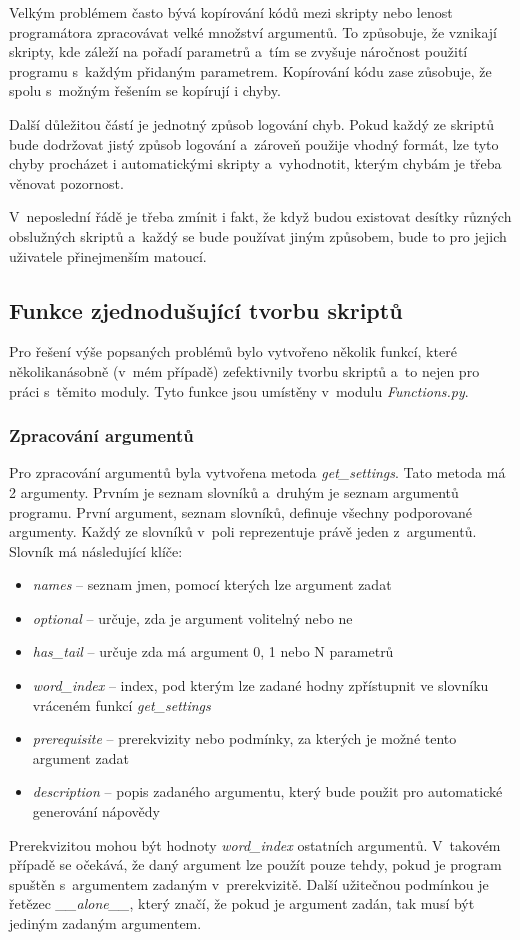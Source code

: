 Velkým problémem často bývá kopírování kódů mezi skripty nebo lenost programátora zpracovávat
velké množství argumentů. To způsobuje, že vznikají skripty, kde záleží na pořadí parametrů
a~tím se zvyšuje náročnost použití programu s~každým přidaným parametrem.
Kopírování kódu zase zůsobuje, že spolu s~možným řešením se kopírují i chyby.

Další důležitou částí je jednotný způsob logování chyb. Pokud každý ze skriptů bude dodržovat
jistý způsob logování a~zároveň použije vhodný formát, lze tyto chyby procházet i automatickými
skripty a~vyhodnotit, kterým chybám je třeba věnovat pozornost.

V~neposlední řádě je třeba zmínit i fakt, že když budou existovat desítky různých obslužných skriptů
a~každý se bude používat jiným způsobem, bude to pro jejich uživatele přinejmenším matoucí.

\subsection{Funkce zjednodušující tvorbu skriptů}
Pro řešení výše popsaných problémů bylo vytvořeno několik funkcí, které několikanásobně (v~mém případě)
zefektivnily tvorbu skriptů a~to nejen pro práci s~těmito moduly. Tyto funkce jsou umístěny v~modulu
\textit{Functions.py}.

\subsubsection{Zpracování argumentů}
Pro zpracování argumentů byla vytvořena metoda \textit{get\_settings}. Tato metoda má 2 argumenty.
Prvním je seznam slovníků a~druhým je seznam argumentů programu. První argument, seznam slovníků, definuje
všechny podporované argumenty. Každý ze slovníků v~poli reprezentuje právě jeden z~argumentů.
Slovník má následující klíče:
\begin{itemize}
    \item \textit{names} -- seznam jmen, pomocí kterých lze argument zadat
    \item \textit{optional} -- určuje, zda je argument volitelný nebo ne
    \item \textit{has\_tail} -- určuje zda má argument 0, 1 nebo N parametrů
    \item \textit{word\_index} -- index, pod kterým lze zadané hodny zpřístupnit ve slovníku vráceném funkcí \textit{get\_settings}
    \item \textit{prerequisite} -- prerekvizity nebo podmínky, za kterých je možné tento argument zadat
    \item \textit{description} -- popis zadaného argumentu, který bude použit pro automatické generování nápovědy
\end{itemize}
Prerekvizitou mohou být hodnoty \textit{word\_index} ostatních argumentů. V~takovém případě se očekává,
že daný argument lze použít pouze tehdy, pokud je program spuštěn s~argumentem zadaným v~prerekvizitě.
Další užitečnou podmínkou je řetězec \textit{\_\_alone\_\_}, který značí, že pokud je argument zadán,
tak musí být jediným zadaným argumentem.

